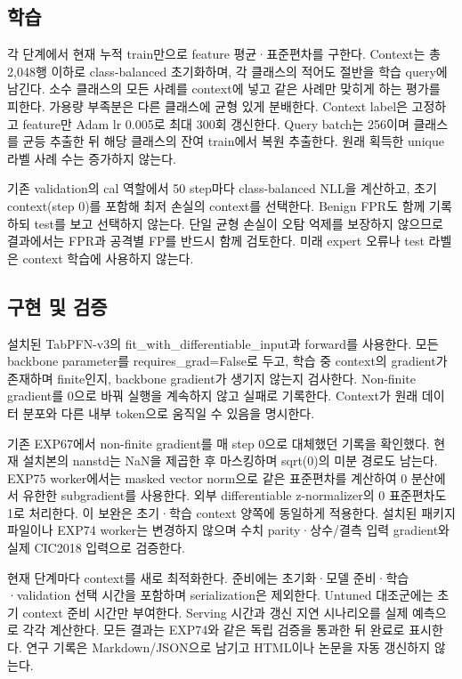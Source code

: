 \subsection{학습}
각 단계에서 현재 누적 train만으로 feature 평균·표준편차를 구한다. Context는 총 2,048행 이하로 class-balanced 초기화하며, 각 클래스의 적어도 절반을 학습 query에 남긴다. 소수 클래스의 모든 사례를 context에 넣고 같은 사례만 맞히게 하는 평가를 피한다. 가용량 부족분은 다른 클래스에 균형 있게 분배한다. Context label은 고정하고 feature만 Adam lr 0.005로 최대 300회 갱신한다. Query batch는 256이며 클래스를 균등 추출한 뒤 해당 클래스의 잔여 train에서 복원 추출한다. 원래 획득한 unique 라벨 사례 수는 증가하지 않는다.

기존 validation의 cal 역할에서 50 step마다 class-balanced NLL을 계산하고, 초기 context(step 0)를 포함해 최저 손실의 context를 선택한다. Benign FPR도 함께 기록하되 test를 보고 선택하지 않는다. 단일 균형 손실이 오탐 억제를 보장하지 않으므로 결과에서는 FPR과 공격별 FP를 반드시 함께 검토한다. 미래 expert 오류나 test 라벨은 context 학습에 사용하지 않는다.

\subsection{구현 및 검증}
설치된 TabPFN-v3의 fit\_\allowbreak{}with\_\allowbreak{}differentiable\_\allowbreak{}input과 forward를 사용한다. 모든 backbone parameter를 requires\_\allowbreak{}grad=\allowbreak{}False로 두고, 학습 중 context의 gradient가 존재하며 finite인지, backbone gradient가 생기지 않는지 검사한다. Non-finite gradient를 0으로 바꿔 실행을 계속하지 않고 실패로 기록한다. Context가 원래 데이터 분포와 다른 내부 token으로 움직일 수 있음을 명시한다.

기존 EXP67에서 non-finite gradient를 매 step 0으로 대체했던 기록을 확인했다. 현재 설치본의 nanstd는 NaN을 제곱한 후 마스킹하며 sqrt(0)의 미분 경로도 남는다. EXP75 worker에서는 masked vector norm으로 같은 표준편차를 계산하여 0 분산에서 유한한 subgradient를 사용한다. 외부 differentiable z-normalizer의 0 표준편차도 1로 처리한다. 이 보완은 초기·학습 context 양쪽에 동일하게 적용한다. 설치된 패키지 파일이나 EXP74 worker는 변경하지 않으며 수치 parity·상수/\allowbreak{}결측 입력 gradient와 실제 CIC2018 입력으로 검증한다.

현재 단계마다 context를 새로 최적화한다. 준비에는 초기화·모델 준비·학습·validation 선택 시간을 포함하며 serialization은 제외한다. Untuned 대조군에는 초기 context 준비 시간만 부여한다. Serving 시간과 갱신 지연 시나리오를 실제 예측으로 각각 계산한다. 모든 결과는 EXP74와 같은 독립 검증을 통과한 뒤 완료로 표시한다. 연구 기록은 Markdown/\allowbreak{}JSON으로 남기고 HTML이나 논문을 자동 갱신하지 않는다.



